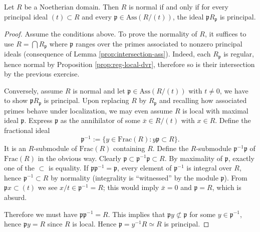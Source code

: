\begin{proposition}\label{prop:normality-principal}
	Let $R$ be a Noetherian domain. Then $R$ is normal if and only if for every principal ideal $(t) \subset R$ and every $\mathfrak{p} \in \text{Ass}(R/(t))$, the ideal $\mathfrak{p}R_{\mathfrak{p}}$ is principal.
\end{proposition}
\begin{proof}
	Assume the conditions above. To prove the normality of $R$, it suffices to use $R = \bigcap R_{\mathfrak{p}}$ where $\mathfrak{p}$ ranges over the primes associated to nonzero principal ideals (consequence of Lemma \ref{prop:intersection-ass}). Indeed, each $R_{\mathfrak{p}}$ is regular, hence normal by Proposition \ref{prop:reg-local-dvr}, therefore so is their intersection by the previous exercise.
	
	Conversely, assume $R$ is normal and let $\mathfrak{p} \in \text{Ass}(R/(t))$ with $t \neq 0$, we have to show $\mathfrak{p}R_{\mathfrak{p}}$ is principal. Upon replacing $R$ by $R_{\mathfrak{p}}$ and recalling how associated primes behave under localization, we may even assume $R$ is local with maximal ideal $\mathfrak{p}$. Express $\mathfrak{p}$ as the annihilator of some $\bar{x} \in R/(t)$ with $x \in R$. Define the fractional ideal
	\[ \mathfrak{p}^{-1} := \{ y \in \text{Frac}(R) : y\mathfrak{p} \subset R \}. \]
	It is an $R$-submodule of $\text{Frac}(R)$ containing $R$. Define the $R$-submodule $\mathfrak{p}^{-1}\mathfrak{p}$ of $\text{Frac}(R)$ in the obvious way. Clearly $\mathfrak{p} \subset \mathfrak{p}^{-1}\mathfrak{p} \subset R$. By maximality of $\mathfrak{p}$, exactly one of the $\subset$ is equality. If $\mathfrak{p}\mathfrak{p}^{-1}=\mathfrak{p}$, every element of $\mathfrak{p}^{-1}$ is integral over $R$, hence $\mathfrak{p}^{-1} \subset R$ by normality (integrality is ``witnessed'' by the module $\mathfrak{p}$). From $\mathfrak{p}x \subset (t)$ we see $x/t \in \mathfrak{p}^{-1} = R$; this would imply $\bar{x} = 0$ and $\mathfrak{p}=R$, which is absurd.
	
	Therefore we must have $\mathfrak{p}\mathfrak{p}^{-1} = R$. This implies that $\mathfrak{p}y \not\subset \mathfrak{p}$ for some $y \in \mathfrak{p}^{-1}$, hence $\mathfrak{p}y = R$ since $R$ is local. Hence $\mathfrak{p} = y^{-1}R \simeq R$ is principal.
\end{proof}

